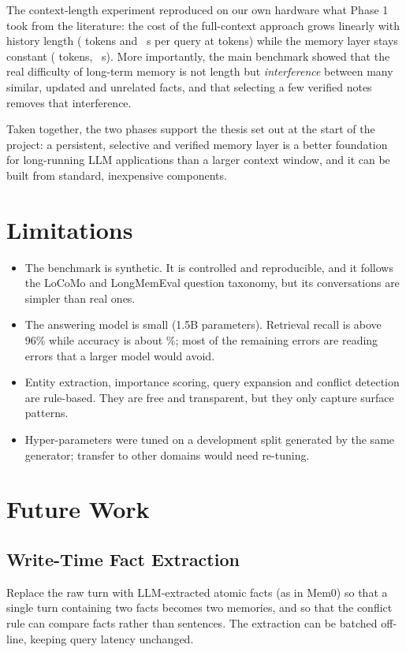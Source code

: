 The context-length experiment reproduced on our own hardware what Phase 1 took from the literature: the
cost of the full-context approach grows linearly with history length (\niahTokFullLast{} tokens and
\niahLatFullLast{}~s per query at \niahMaxLen{} tokens) while the memory layer stays constant
(\niahTokMemLast{} tokens, \niahLatMemLast{}~s). More importantly, the main benchmark showed that the real
difficulty of long-term memory is not length but \emph{interference} between many similar, updated and
unrelated facts, and that selecting a few verified notes removes that interference.

Taken together, the two phases support the thesis set out at the start of the project: a persistent,
selective and verified memory layer is a better foundation for long-running LLM applications than a larger
context window, and it can be built from standard, inexpensive components.

\section{Limitations}
\begin{itemize}[nosep]
  \item The benchmark is synthetic. It is controlled and reproducible, and it follows the LoCoMo and
        LongMemEval question taxonomy, but its conversations are simpler than real ones.
  \item The answering model is small (1.5B parameters). Retrieval recall is above 96\% while accuracy is
        about \accMem\%; most of the remaining errors are reading errors that a larger model would avoid.
  \item Entity extraction, importance scoring, query expansion and conflict detection are rule-based. They
        are free and transparent, but they only capture surface patterns.
  \item Hyper-parameters were tuned on a development split generated by the same generator; transfer to
        other domains would need re-tuning.
\end{itemize}

\section{Future Work}
\subsection{Write-Time Fact Extraction}
Replace the raw turn with LLM-extracted atomic facts (as in Mem0) so that a single turn containing two facts
becomes two memories, and so that the conflict rule can compare facts rather than sentences. The
extraction can be batched off-line, keeping query latency unchanged.

